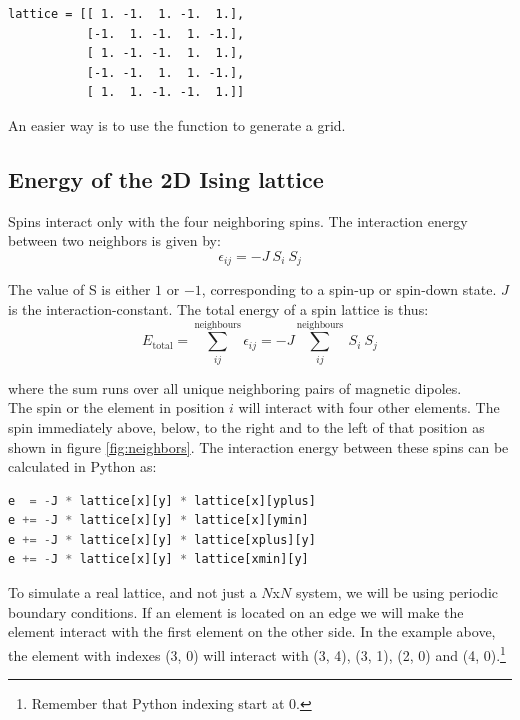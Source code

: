 \documentclass{article}
\begin{document}
\begin{lstlisting}
lattice = [[ 1. -1.  1. -1.  1.],
           [-1.  1. -1.  1. -1.],
           [ 1. -1. -1.  1.  1.],
           [-1. -1.  1.  1. -1.],
           [ 1.  1. -1. -1.  1.]]
\end{lstlisting}

An easier way is to use the  function to generate a grid.

\subsection{Energy of the 2D Ising lattice} \label{section:energy}

Spins interact only with the four neighboring spins. The interaction energy between two neighbors is given by:
\begin{equation}
\epsilon_{ij} = -J \ S_i \ S_j
\end{equation} 

The value of S is either $1$ or $-1$, corresponding to a spin-up or spin-down state. $J$ is the interaction-constant.
The total energy of a spin lattice is thus:
\begin{equation}
E_{\mathrm{total}}=\sum^{\mathrm{neighbours}}_{ij} \epsilon_{ij} = -J \sum^{\mathrm{neighbours}}_{ij} \ S_i \ S_j
\end{equation}

where the sum runs over all unique neighboring pairs of magnetic dipoles.\\

The spin or the element in position $i$ will interact with four other elements.
The spin immediately above, below, to the right and to the left of that position as shown in figure \ref{fig:neighbors}.
The interaction energy  between these spins can be calculated in Python as:

\begin{lstlisting}[language=python]
e  = -J * lattice[x][y] * lattice[x][yplus]
e += -J * lattice[x][y] * lattice[x][ymin]
e += -J * lattice[x][y] * lattice[xplus][y]
e += -J * lattice[x][y] * lattice[xmin][y]
\end{lstlisting}

To simulate a real lattice, and not just a $N$x$N$ system, we will be using
periodic boundary conditions.
If an element is located on an edge we will make the element interact with the first element on the other side.
In the example above, the element with indexes (3, 0) will interact with (3, 4), (3, 1), (2, 0) and (4, 0).\footnote{Remember that Python indexing start at 0.}\\
\end{document}
